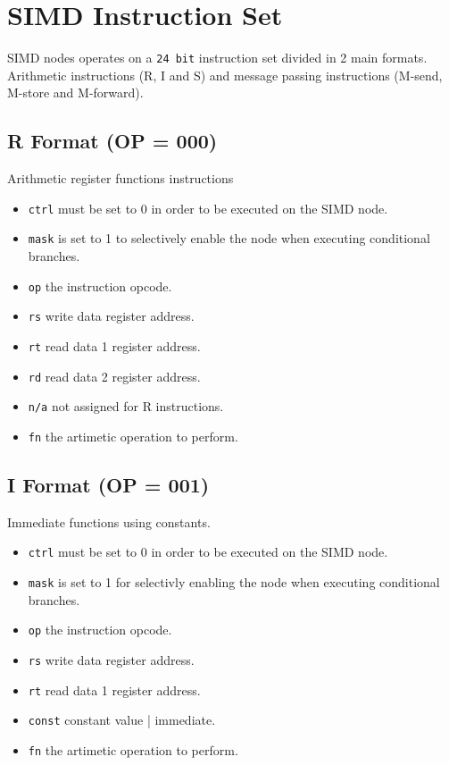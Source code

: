 \section{SIMD Instruction Set}\label{apx:simd-instruction-set}

SIMD nodes operates on a {\tt 24 bit} instruction set divided in 2 main
formats. Arithmetic instructions (R, I and S) and message passing instructions
(M-send, M-store and M-forward). 

\subsection[R Format]{R Format (OP = 000)}
Arithmetic register functions instructions



\begin{itemize}
\item {\tt ctrl} must be set to 0 in order to be executed on the SIMD node.
\item {\tt mask} is set to 1 to selectively enable the node when executing
  conditional branches.
\item {\tt op} the instruction opcode.
\item {\tt rs} write data register address.
\item {\tt rt} read data 1 register address.
\item {\tt rd} read data 2 register address.
\item {\tt n/a} not assigned for R instructions.
\item {\tt fn} the artimetic operation to perform.
\end{itemize}



\subsection[I Format]{I Format (OP = 001)}
Immediate functions using constants.



\begin{itemize}
\item {\tt ctrl} must be set to 0 in order to be executed on the SIMD node.
\item {\tt mask} is set to 1 for selectivly enabling the node when executing
  conditional branches.
\item {\tt op} the instruction opcode.
\item {\tt rs} write data register address.
\item {\tt rt} read data 1 register address.
\item {\tt const} constant value | immediate.
\item {\tt fn} the artimetic operation to perform.
\end{itemize}

